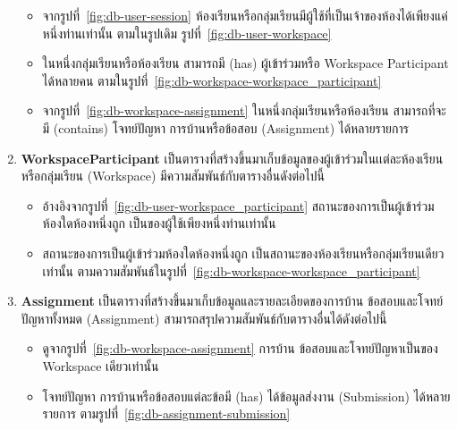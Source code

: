 \documentclass[12pt,one side,openright,a4paper]{cpe-thesis-th}
\begin{document}
\begin{enumerate}
\begin{figure}[H]
          \label{fig:db-workspace}
        \end{figure}
        \begin{itemize}
          \item จากรูปที่~\ref{fig:db-user-session} ห้องเรียนหรือกลุ่มเรียนมีผู้ใช้ที่เป็นเจ้าของห้องได้เพียงแค่หนึ่งท่านเท่านั้น ตามในรูปเดิม รูปที่~\ref{fig:db-user-workspace}
          \item ในหนึ่งกลุ่มเรียนหรือห้องเรียน สามารถมี (has) ผู้เข้าร่วมหรือ Workspace Participant ได้หลายคน ตามในรูปที่~\ref{fig:db-workspace-workspace_participant}
          \item จากรูปที่~\ref{fig:db-workspace-assignment} ในหนึ่งกลุ่มเรียนหรือห้องเรียน สามารถที่จะมี (contains) โจทย์ปัญหา การบ้านหรือข้อสอบ (Assignment) ได้หลายรายการ
        \end{itemize}
  \item \textbf{WorkspaceParticipant}
        เป็นตารางที่สร้างขึ้นมาเก็บข้อมูลของผู้เข้าร่วมในเเต่ละห้องเรียนหรือกลุ่มเรียน (Workspace) มีความสัมพันธ์กับตารางอื่นดังต่อไปนี้
        \begin{itemize}
          \item อ้างอิงจากรูปที่~\ref{fig:db-user-workspace_participant} สถานะของการเป็นผู้เข้าร่วมห้องใดห้องหนึ่งถูก เป็นของผู้ใช้เพียงหนึ่งท่านเท่านั้น
          \item สถานะของการเป็นผู้เข้าร่วมห้องใดห้องหนึ่งถูก เป็นสถานะของห้องเรียนหรือกลุ่มเรียนเดียวเท่านั้น ตามความสัมพันธ์ในรูปที่~\ref{fig:db-workspace-workspace_participant}
        \end{itemize}
  \item \textbf{Assignment}
        เป็นตารางที่สร้างขึ้นมาเก็บข้อมูลและรายละเอียดของการบ้าน ข้อสอบและโจทย์ปัญหาทั้งหมด (Assignment) สามารถสรุปความสัมพันธ์กับตารางอื่นได้ดังต่อไปนี้
        \begin{itemize}
          \item ดูจากรูปที่~\ref{fig:db-workspace-assignment} การบ้าน ข้อสอบและโจทย์ปัญหาเป็นของ Workspace เดียวเท่านั้น
          \item โจทย์ปัญหา การบ้านหรือข้อสอบแต่ละข้อมี (has) ได้ข้อมูลส่งงาน (Submission) ได้หลายรายการ ตามรูปที่~\ref{fig:db-assignment-submission}
                \begin{figure}[H]
                  \centering
                  \begin{tikzpicture}[auto,node distance=1.5cm]

\end{tikzpicture}
\end{figure}
\end{itemize}
\end{enumerate}
\end{document}
